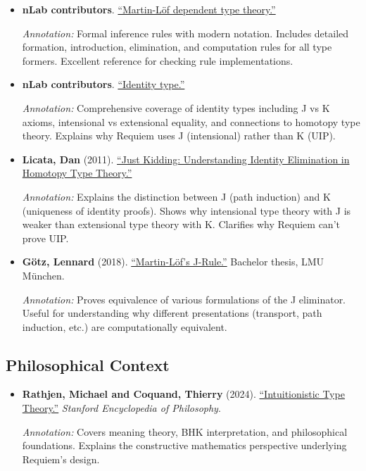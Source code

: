 \documentclass[11pt]{article}
\begin{document}
\begin{itemize}[leftmargin=*]
\item \textbf{nLab contributors}. \href{https://ncatlab.org/nlab/show/Martin-Lof+dependent+type+theory}{``Martin-Löf dependent type theory.''}

\textit{Annotation:} Formal inference rules with modern notation. Includes detailed formation, introduction, elimination, and computation rules for all type formers. Excellent reference for checking rule implementations.

\item \textbf{nLab contributors}. \href{https://ncatlab.org/nlab/show/identity+type}{``Identity type.''}

\textit{Annotation:} Comprehensive coverage of identity types including J vs K axioms, intensional vs extensional equality, and connections to homotopy type theory. Explains why Requiem uses J (intensional) rather than K (UIP).

\item \textbf{Licata, Dan} (2011). \href{https://homotopytypetheory.org/2011/04/10/just-kidding-understanding-identity-elimination-in-homotopy-type-theory}{``Just Kidding: Understanding Identity Elimination in Homotopy Type Theory.''}

\textit{Annotation:} Explains the distinction between J (path induction) and K (uniqueness of identity proofs). Shows why intensional type theory with J is weaker than extensional type theory with K. Clarifies why Requiem can't prove UIP.

\item \textbf{Götz, Lennard} (2018). \href{https://www.math.lmu.de/~petrakis/Goetz.pdf}{``Martin-Löf's J-Rule.''} Bachelor thesis, LMU München.

\textit{Annotation:} Proves equivalence of various formulations of the J eliminator. Useful for understanding why different presentations (transport, path induction, etc.) are computationally equivalent.

\end{itemize}

\subsection{Philosophical Context}

\begin{itemize}[leftmargin=*]
\item \textbf{Rathjen, Michael and Coquand, Thierry} (2024). \href{https://plato.stanford.edu/entries/type-theory-intuitionistic/}{``Intuitionistic Type Theory.''} \emph{Stanford Encyclopedia of Philosophy}.

\textit{Annotation:} Covers meaning theory, BHK interpretation, and philosophical foundations. Explains the constructive mathematics perspective underlying Requiem's design.

\end{itemize}
\end{document}
